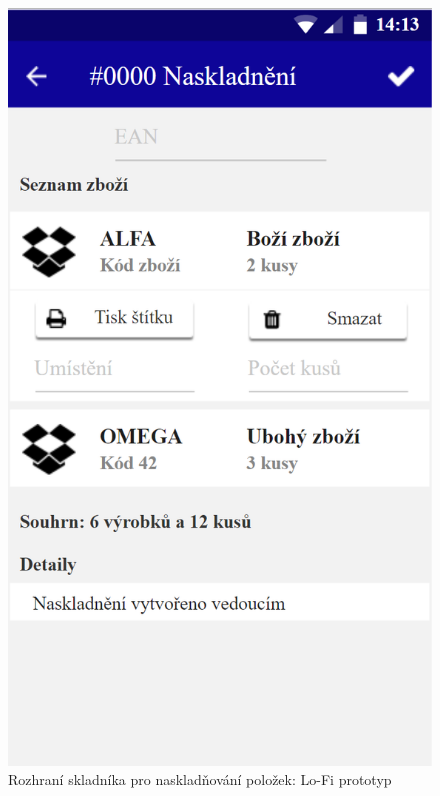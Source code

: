 \begin{figure}[]
\includegraphics[height=0.6\textheight]{../png/axure/naskladneni.png}
\caption{Rozhraní skladníka pro naskladňování položek: Lo-Fi prototyp} \label{picture:axure}
\end{figure}
